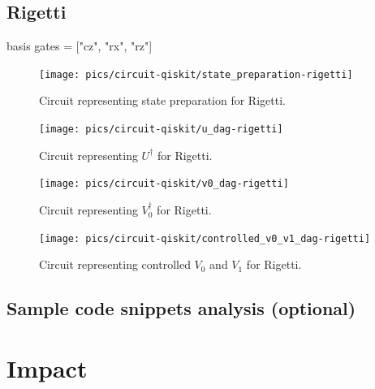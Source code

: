 \documentclass[preprint,12pt, a4paper]{elsarticle}
\newcommand{\ket}[1]{\ensuremath{|#1\rangle}}
\newcommand{\1}{{\rm 1\hspace{-0.9mm}l}}
\newcommand{\Id}{{\rm 1\hspace{-0.9mm}l}}
\newcommand{\ee}{\ensuremath{\mathrm{e}}}
\newcommand{\ii}{\ensuremath{\mathrm{i}}}
\newcommand{\PP}{\mathcal{P}}
\begin{document}
\subsection{Rigetti}
 basis gates = ["cz", "rx", "rz"]
\begin{figure}[h!]
\centering
\texttt{[image: pics/circuit-qiskit/state\_preparation-rigetti]}
\caption{Circuit representing state preparation for Rigetti.}
\end{figure}
\begin{figure}[h!]
\centering
\texttt{[image: pics/circuit-qiskit/u\_dag-rigetti]}
\caption{Circuit representing $U^\dagger$ for Rigetti.}
\end{figure}
\begin{figure}[h!]
\centering
\texttt{[image: pics/circuit-qiskit/v0\_dag-rigetti]}
\caption{Circuit representing $V_0^\dagger$ for Rigetti.}
\end{figure}
\begin{figure}[h!]
\centering
\texttt{[image: pics/circuit-qiskit/controlled\_v0\_v1\_dag-rigetti]}
\caption{Circuit representing controlled $V_0$ and $V_1$ for Rigetti.}
\end{figure}


\subsection{Sample code snippets analysis (optional)}
\label{}










\section{Impact }
\end{document}
